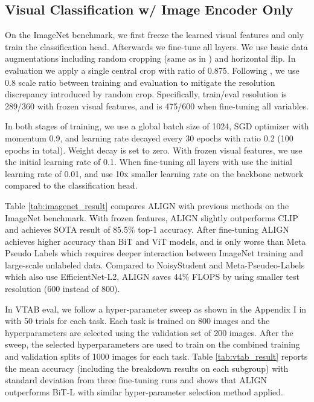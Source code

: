 \documentclass{article}
\begin{document}
\subsection{Visual Classification w/ Image Encoder Only}

On the ImageNet benchmark, we first freeze the learned visual features and only train the classification head. Afterwards we fine-tune all layers. We use basic data augmentations including random cropping (same as in \citet{szegedy:inception}) and horizontal flip. In evaluation we apply a single central crop with ratio of 0.875. Following \citet{touvron:fixres}, we use 0.8 scale ratio between training and evaluation to mitigate the resolution discrepancy introduced by random crop. Specifically, train/eval resolution is 289/360 with frozen visual features, and is 475/600 when fine-tuning all variables.

In both stages of training, we use a global batch size of 1024, SGD optimizer with momentum 0.9, and learning rate decayed every 30 epochs with ratio 0.2 (100 epochs in total). Weight decay is set to zero. With frozen visual features, we use the initial learning rate of 0.1. When fine-tuning all layers with use the initial learning rate of 0.01, and use 10x smaller learning rate on the  backbone network compared to the classification head.

Table \ref{tab:imagenet_result} compares ALIGN with previous methods on the ImageNet benchmark. With frozen features, ALIGN slightly outperforms CLIP and achieves SOTA result of 85.5\% top-1 accuracy. After fine-tuning ALIGN achieves higher accuracy than BiT and ViT models, and is only worse than Meta Pseudo Labels which requires deeper interaction between ImageNet training and large-scale unlabeled data. Compared to NoisyStudent and Meta-Pseudeo-Labels which also use EfficientNet-L2, ALIGN saves 44\% FLOPS by using smaller test resolution (600 instead of 800).

In VTAB eval, we follow a hyper-parameter sweep as shown in the Appendix I in \cite{zhai:vtab} with 50 trials for each task. Each task is trained on 800 images and the hyperparameters are selected using the validation set of 200 images. After the sweep, the selected hyperparameters are used to train on the combined training and validation splits of 1000 images for each task. Table \ref{tab:vtab_result} reports the mean accuracy (including the breakdown results on each subgroup) with standard deviation from three fine-tuning runs and shows that ALIGN outperforms BiT-L \cite{kolensnikov:bit} with similar hyper-parameter selection method applied.
\end{document}
